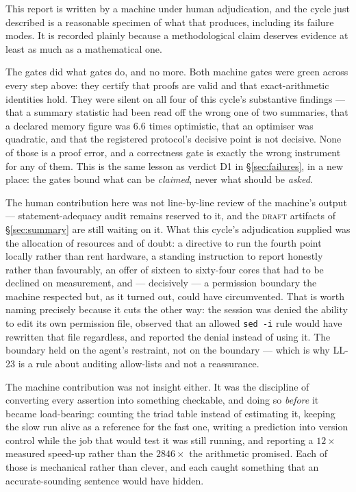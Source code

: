 \documentclass[11pt,a4paper]{article}
\theoremstyle{definition}
\theoremstyle{plain}
\begin{document}
This report is written by a machine under human adjudication, and the cycle just described is a
reasonable specimen of what that produces, including its failure modes. It is recorded plainly
because a methodological claim deserves evidence at least as much as a mathematical one.

The gates did what gates do, and no more. Both machine gates were green across every step above:
they certify that proofs are valid and that exact-arithmetic identities hold. They were silent
on all four of this cycle's substantive findings --- that a summary statistic had been read off
the wrong one of two summaries, that a declared memory figure was $6.6$ times optimistic, that
an optimiser was quadratic, and that the registered protocol's decisive point is not decisive.
None of those is a proof error, and a correctness gate is exactly the wrong instrument for any
of them. This is the same lesson as verdict D1 in \S\ref{sec:failures}, in a new place: the
gates bound what can be \emph{claimed}, never what should be \emph{asked}.

The human contribution here was not line-by-line review of the machine's output ---
statement-adequacy audit remains reserved to it, and the \textsc{draft} artifacts of
\S\ref{sec:summary} are still waiting on it. What this cycle's adjudication supplied was the
allocation of resources and of doubt: a directive to run the fourth point locally rather than rent hardware, a
standing instruction to report honestly rather than favourably, an offer of sixteen to
sixty-four cores that had to be declined on measurement, and --- decisively --- a permission
boundary the machine respected but, as it turned out, could have circumvented. That is worth
naming precisely because it cuts the other way: the session was denied the ability to edit its
own permission file, observed that an allowed \texttt{sed -i} rule would have rewritten that
file regardless, and reported the denial instead of using it. The boundary held on the agent's
restraint, not on the boundary --- which is why LL-23 is a rule about auditing allow-lists and
not a reassurance.

The machine contribution was not insight either. It was the discipline of converting every
assertion into something checkable, and doing so \emph{before} it became load-bearing: counting
the triad table instead of estimating it, keeping the slow run alive as a reference for the fast
one, writing a prediction into version control while the job that would test it was still
running, and reporting a $12\times$ measured speed-up rather than the $2846\times$ the
arithmetic promised. Each of those is mechanical rather than clever, and each caught something
that an accurate-sounding sentence would have hidden.
\end{document}
